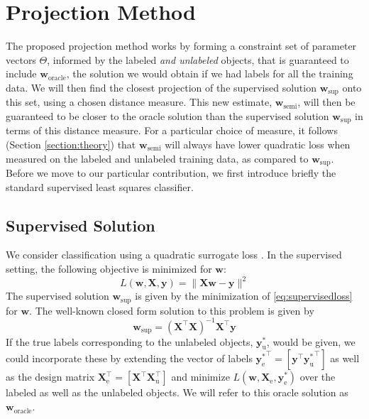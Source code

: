 \documentclass[sts,preprint]{imsart-custom}
\newcommand{\Xe}{\vec{X}_\mathrm{e}  }
\renewcommand{\vec}[1]{\mathbf{#1}}
\begin{document}
\section{Projection Method}
\label{section:projections}
The proposed projection method works by forming a constraint set of parameter vectors $\Theta$, informed by the labeled \emph{and unlabeled} objects, that is guaranteed to include $\vec{w}_\text{oracle}$, the solution we would obtain if we had labels for all the training data. We will then find the closest projection of the supervised solution $\vec{w}_{\text{sup}}$ onto this set, using a chosen distance measure. This new estimate, $\vec{w}_{\text{semi}}$, will then be guaranteed to be closer to the oracle solution than the supervised solution $\vec{w}_{\text{sup}}$ in terms of this distance measure. For a particular choice of measure, it follows (Section \ref{section:theory}) that $\vec{w}_{\text{semi}}$ will always have lower quadratic loss when measured on the labeled and unlabeled training data, as compared to $\vec{w}_{\text{sup}}$.
Before we move to our particular contribution, we first introduce briefly the standard supervised least squares classifier.

\subsection{Supervised Solution}
We consider classification using a quadratic surrogate loss \citep{Hastie2009}. In the supervised setting, the following objective is minimized for $\vec{w}$:
\begin{equation}
\label{eq:supervisedloss}
L(\vec{w},\vec{X},\vec{y}) = \lVert \vec{X} \vec{w} - \vec{y} \rVert^2
\end{equation}
The supervised solution $\vec{w}_{\text{sup}}$ is given by the minimization of \eqref{eq:supervisedloss} for $\vec{w}$. The well-known closed form solution to this problem is given by
\begin{equation}
\label{eq:supervisedsolution}
\vec{w}_{\text{sup}} = (\vec{X}^\top \vec{X})^{-1} \vec{X}^\top \vec{y}
\end{equation}
If the true labels corresponding to the unlabeled objects, $\vec{y}_\text{u}^{\ast}$, would be given, we could incorporate these by extending the vector of labels ${\vec{y}_\text{e}^\ast}^\top = \left[ \vec{y}^\top {\vec{y}_\text{u}^\ast}^\top \right]$ as well as the design matrix $\vec{X}_\text{e}^\top = \left[ \vec{X}^\top \vec{X}_\text{u}^\top \right]$ and minimize $L(\vec{w},\Xe, \vec{y}_\text{e}^\ast)$ over the labeled as well as the unlabeled objects. We will refer to this oracle solution as $\vec{w}_\text{oracle}$. 
\end{document}
